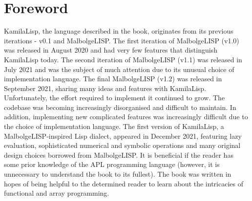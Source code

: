 
\chapter*{Foreword}
\par KamilaLisp, the language described in the book, originates from its previous iterations - v0.1 and MalbolgeLISP. The first iteration of MalbolgeLISP (v1.0) was released in August 2020 and had very few features that distinguish KamilaLisp today. The second iteration of MalbolgeLISP (v1.1) was released in July 2021 and was the subject of much attention due to its unusual choice of implementation language. The final MalbolgeLISP (v1.2) was released in September 2021, sharing many ideas and features with KamilaLisp. Unfortunately, the effort required to implement it continued to grow. The codebase was becoming increasingly disorganised and difficult to maintain. In addition, implementing new complicated features was increasingly difficult due to the choice of implementation language. The first version of KamilaLisp, a MalbolgeLISP-inspired Lisp dialect, appeared in December 2021, featuring lazy evaluation, sophisticated numerical and symbolic operations and many original design choices borrowed from MalbolgeLISP. It is beneficial if the reader has some prior knowledge of the APL programming language (however, it is unnecessary to understand the book to its fullest). The book was written in hopes of being helpful to the determined reader to learn about the intricacies of functional and array programming.